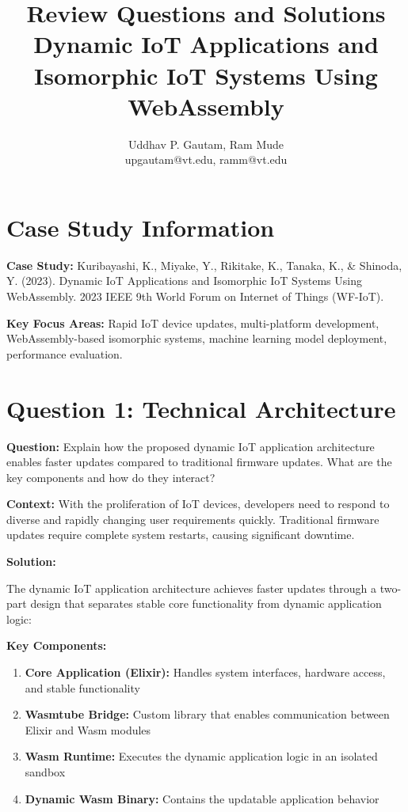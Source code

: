\documentclass[11pt]{article}
\title{Review Questions and Solutions\\Dynamic IoT Applications and Isomorphic IoT Systems Using WebAssembly}
\author{Uddhav P. Gautam, Ram Mude\\
\small upgautam@vt.edu, ramm@vt.edu}
\date{}
\begin{document}
\maketitle

\singlespacing

\section*{Case Study Information}
\textbf{Case Study:} Kuribayashi, K., Miyake, Y., Rikitake, K., Tanaka, K., \& Shinoda, Y. (2023). Dynamic IoT Applications and Isomorphic IoT Systems Using WebAssembly. 2023 IEEE 9th World Forum on Internet of Things (WF-IoT).

\textbf{Key Focus Areas:} Rapid IoT device updates, multi-platform development, WebAssembly-based isomorphic systems, machine learning model deployment, performance evaluation.

\section*{Question 1: Technical Architecture}

\textbf{Question:} Explain how the proposed dynamic IoT application architecture enables faster updates compared to traditional firmware updates. What are the key components and how do they interact?

\textbf{Context:} With the proliferation of IoT devices, developers need to respond to diverse and rapidly changing user requirements quickly. Traditional firmware updates require complete system restarts, causing significant downtime.

\textbf{Solution:}

The dynamic IoT application architecture achieves faster updates through a two-part design that separates stable core functionality from dynamic application logic:

\textbf{Key Components:}
\begin{enumerate}[label=\arabic*.]
\item \textbf{Core Application (Elixir):} Handles system interfaces, hardware access, and stable functionality
\item \textbf{Wasmtube Bridge:} Custom library that enables communication between Elixir and Wasm modules
\item \textbf{Wasm Runtime:} Executes the dynamic application logic in an isolated sandbox
\item \textbf{Dynamic Wasm Binary:} Contains the updatable application behavior
\end{enumerate}
\end{document}
